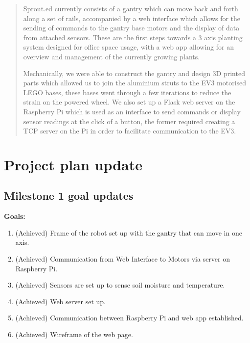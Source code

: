 \documentclass{article}
\begin{document}
 



\begin{abstract}
Sprout.ed currently consists of a gantry which can move back and forth along a set of rails, accompanied by a web interface which allows for the sending of commands to the gantry base motors and the display of data from attached sensors. These are the first steps towards a 3 axis planting system designed for office space usage, with a web app allowing for an overview and management of the currently growing plants. 

Mechanically, we were able to construct the gantry and design 3D printed parts which allowed us to join the aluminium struts to the EV3 motorised LEGO bases, these bases went through a few iterations to reduce the strain on the powered wheel. We also set up a Flask web server on the Raspberry Pi which is used as an interface to send commands or display sensor readings at the click of a button, the former required creating a TCP server on the Pi in order to facilitate communication to the EV3.
\end{abstract} 
\vspace{-8mm}

\section{Project plan update} 

\subsection{Milestone 1 goal updates}
\textbf{Goals:}
\begin{enumerate}
    \vspace{-3mm}
    \setlength{\itemsep}{0pt}%
    \setlength{\parskip}{0pt}
    \item (Achieved) Frame of the robot set up with the gantry that can move in one axis. 
    \item (Achieved) Communication from Web Interface to Motors via server on Raspberry Pi.
    \item (Achieved) Sensors are set up to sense soil moisture and temperature.
    \item (Achieved) Web server set up.
    \item (Achieved) Communication between Raspberry Pi and web app established.
    \item (Achieved) Wireframe of the web page.
    
\end{enumerate}
\end{document}
